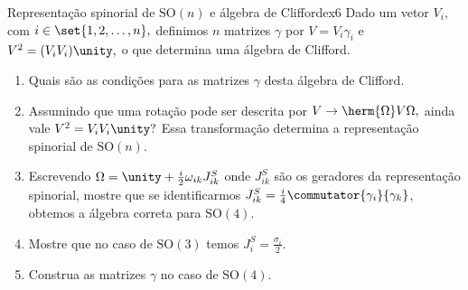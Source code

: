 \begin{exercício}{Representação spinorial de \(\mathrm{SO}(n)\) e álgebra de Clifford}{ex6}
    Dado um vetor \(V_i,\) com \(i \in \set{1,2,\dots, n},\) definimos \(n\) matrizes \(\gamma\) por \(V = V_i \gamma_i\) e \(V^2 = (V_i V_i) \unity,\) o que determina uma álgebra de Clifford.
    \begin{enumerate}[label=(\alph*)]
        \item Quais são as condições para as matrizes \(\gamma\) desta álgebra de Clifford.
        \item Assumindo que uma rotação pode ser descrita por \(V \to \herm{\Omega}V \Omega,\) ainda vale \(V^2 = V_i V_i \unity?\) Essa transformação determina a representação spinorial de \(\mathrm{SO}(n)\).
        \item Escrevendo \(\Omega = \unity + \frac{i}{2}\omega_{ik}J^{S}_{ik}\) onde \(J^{S}_{ik}\) são os geradores da representação spinorial, mostre que se identificarmos \(J^{S}_{ik} = \frac{i}{4}\commutator{\gamma_i}{\gamma_k}\), obtemos a álgebra correta para \(\mathrm{SO}(4).\)
        \item Mostre que no caso de \(\mathrm{SO}(3)\) temos \(J^{S}_i = \frac{\sigma_i}{2}\).
        \item Construa as matrizes \(\gamma\) no caso de \(\mathrm{SO}(4)\).
    \end{enumerate}
\end{exercício}
